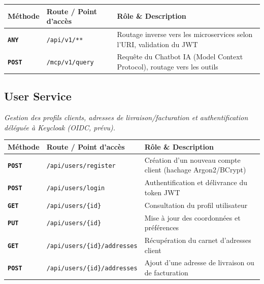 \documentclass[10pt,a4paper]{article}
\begin{document}
\begin{center}
\renewcommand{\arraystretch}{1.08}
\begin{tabularx}{\textwidth}{@{} l p{6.8cm} >{\raggedright\arraybackslash}X @{}}
\toprule[0.8pt]
\rowcolor{hdrcolor}
\textbf{Méthode} & \textbf{Route / Point d'accès} & \textbf{Rôle \& Description} \\
\midrule
\texttt{\textbf{ANY}}  & \texttt{/api/v1/**} & Routage inverse vers les microservices selon l'URI, validation du JWT \\
\textcolor{postgreen}{\texttt{\textbf{POST}}} & \texttt{/mcp/v1/query} & Requête du Chatbot IA (Model Context Protocol), routage vers les outils \\
\bottomrule[0.8pt]
\end{tabularx}
\end{center}

\vspace{3pt}

\subsection{User Service}
\textit{Gestion des profils clients, adresses de livraison/facturation et authentification déléguée à Keycloak (OIDC, prévu).}

\begin{center}
\renewcommand{\arraystretch}{1.08}
\begin{tabularx}{\textwidth}{@{} l p{6.8cm} >{\raggedright\arraybackslash}X @{}}
\toprule[0.8pt]
\rowcolor{hdrcolor}
\textbf{Méthode} & \textbf{Route / Point d'accès} & \textbf{Rôle \& Description} \\
\midrule
\textcolor{postgreen}{\texttt{\textbf{POST}}} & \texttt{/api/users/register} & Création d'un nouveau compte client (hachage Argon2/BCrypt) \\
\textcolor{postgreen}{\texttt{\textbf{POST}}} & \texttt{/api/users/login} & Authentification et délivrance du token JWT \\
\textcolor{syncblue}{\texttt{\textbf{GET}}}  & \texttt{/api/users/\{id\}} & Consultation du profil utilisateur \\
\textcolor{secondary}{\texttt{\textbf{PUT}}}  & \texttt{/api/users/\{id\}} & Mise à jour des coordonnées et préférences \\
\textcolor{syncblue}{\texttt{\textbf{GET}}}  & \texttt{/api/users/\{id\}/addresses} & Récupération du carnet d'adresses client \\
\textcolor{postgreen}{\texttt{\textbf{POST}}} & \texttt{/api/users/\{id\}/addresses} & Ajout d'une adresse de livraison ou de facturation \\
\bottomrule[0.8pt]
\end{tabularx}
\end{center}
\end{document}
